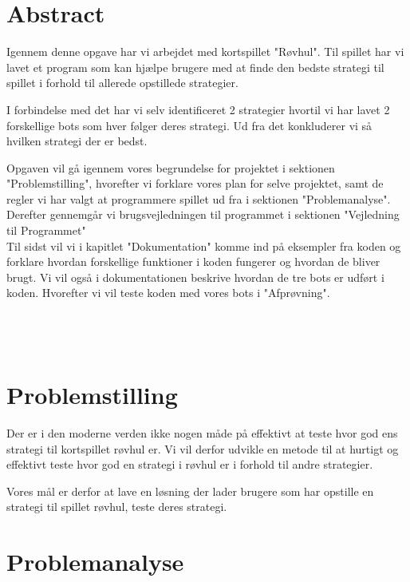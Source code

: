 \documentclass[a4paper, 12pt]{article}
\begin{document}
\begin{multicols}{2}

\section{Abstract}

Igennem denne opgave har vi arbejdet med kortspillet "Røvhul". Til spillet har vi lavet et program som kan hjælpe brugere med at finde den bedste strategi til spillet i forhold til allerede opstillede strategier. 

I forbindelse med det har vi selv identificeret 2 strategier hvortil vi har lavet 2 forskellige bots som hver følger deres strategi. Ud fra det konkluderer vi så hvilken strategi der er bedst.

Opgaven vil gå igennem vores begrundelse for projektet i sektionen "Problemstilling", hvorefter vi forklare vores plan for selve projektet, samt de regler vi har valgt at programmere spillet ud fra i sektionen "Problemanalyse". 
\\
Derefter gennemgår vi brugsvejledningen til programmet i sektionen "Vejledning til Programmet"
\\
Til sidst vil vi i kapitlet "Dokumentation" komme ind på eksempler fra koden og forklare hvordan forskellige funktioner i koden fungerer og hvordan de bliver brugt. Vi vil også i dokumentationen beskrive hvordan de tre bots er udført i koden. Hvorefter vi vil teste koden med vores bots i "Afprøvning".
\\ \\ \\ \\ 

\section{Problemstilling}
Der er i den moderne verden ikke nogen måde på effektivt at teste hvor god ens strategi til kortspillet røvhul er. Vi vil derfor udvikle en metode til at hurtigt og effektivt teste hvor god en strategi i røvhul er i forhold til andre strategier.

Vores mål er derfor at lave en løsning der lader brugere som har opstille en strategi til spillet røvhul, teste deres strategi.

\section{Problemanalyse}


\end{multicols}
\end{document}
